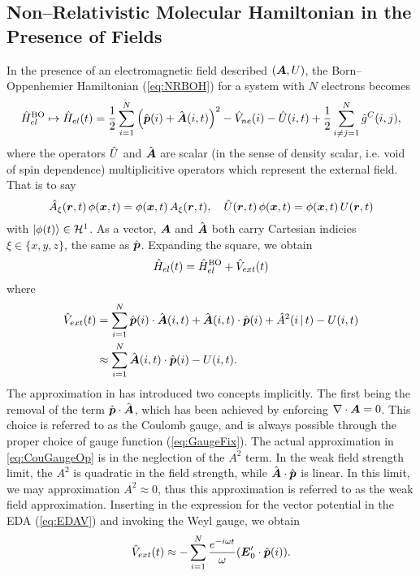 \subsection{Non--Relativistic Molecular Hamiltonian in the Presence of Fields}

In the presence of an electromagnetic field described $(\boldsymbol{A},U)$, the
Born--Oppenhemier Hamiltonian (\cref{eq:NRBOH}) for a system with $N$ electrons
becomes
\begin{equation}
\hat{H}^\mathrm{BO}_{el} \mapsto \hat{H}_{el}(t) = 
  \frac{1}{2} \sum_{i=1}^N \left( \hat{\boldsymbol{p}}(i) + \hat{\boldsymbol{A}}(i,t) \right)^2 - 
  \hat{V}_{ne}(i) - \hat{U}(i , t) + \frac{1}{2}\sum_{i\neq j = 1}^N \hat{g}^C(i,j),
\end{equation}
where the operators $\hat{U}$ and $\hat{\boldsymbol{A}}$ are scalar (in the sense of density scalar,
i.e. void of spin dependence) multiplicitive operators which represent the external field.
That is to say
\begin{equation}
\hat{A}_\xi(\boldsymbol{r} , t )\, \phi(\boldsymbol{x}, t )  = \phi(\boldsymbol{x}, t ) \,A_\xi(\boldsymbol{r}, t) , \quad \hat{U}(\boldsymbol{r} , t) \,\phi(\boldsymbol{x}, t ) = \phi(\boldsymbol{x}, t ) \,U(\boldsymbol{r}, t)
\end{equation}
with $\left\vert \phi (t) \right\rangle \in \mathcal{H}^1$.
As a vector, $\boldsymbol{A}$ and $\hat{\boldsymbol{A}}$ both carry Cartesian indicies $\xi\in \{x,y,z\}$, the same as
$\hat{\boldsymbol{p}}$.
Expanding the square, we obtain
\begin{equation}
\hat{H}_{el}(t) = \hat{H}^\mathrm{BO}_{el} + \hat{V}_{ext}(t)
\end{equation}
where
\begin{align}
\hat{V}_{ext}(t) &= \sum_{i=1}^N \hat{\boldsymbol{p}}(i) \cdot \hat{\boldsymbol{A}}(i , t) + \hat{\boldsymbol{A}}(i , t) \cdot \hat{\boldsymbol{p}}(i) + \hat{A}^2(i \, \vert \, t) - 
  U(i , t) \nonumber \\
  &\approx \sum_{i=1}^N  \hat{\boldsymbol{A}}(i , t) \cdot \hat{\boldsymbol{p}}(i) - U(i , t). \label{eq:CouGaugeOp}
\end{align}
The approximation in  has introduced two concepts implicitly. The first being the removal of the term 
$\hat{\boldsymbol{p}} \cdot \hat{\boldsymbol{A}}$, which has been achieved by enforcing $\nabla \cdot \boldsymbol{A} = 0$. This choice is referred
to as the Coulomb gauge, and is always possible through the proper choice of gauge function (\cref{eq:GaugeFix}). The
actual approximation in \cref{eq:CouGaugeOp} is in the neglection of the $A^2$ term. In the weak field strength limit,
the $A^2$ is quadratic in the field strength, while $\hat{\boldsymbol{A}} \cdot \hat{\boldsymbol{p}}$ is linear. In this limit, we may 
approximation $A^2 \approx 0$, thus this approximation is referred to as the weak field approximation.
Inserting in the expression for the vector potential in the EDA (\cref{eq:EDAV}) and invoking the Weyl gauge, 
we obtain
\begin{equation}
\label{eq:VextVel}
\hat{V}_{ext}(t) \approx -\sum_{i=1}^N \frac{e^{-i\omega t}}{\omega} ( \boldsymbol{E}'_0 \cdot \hat{\boldsymbol{p}}(i) ).
\end{equation}

